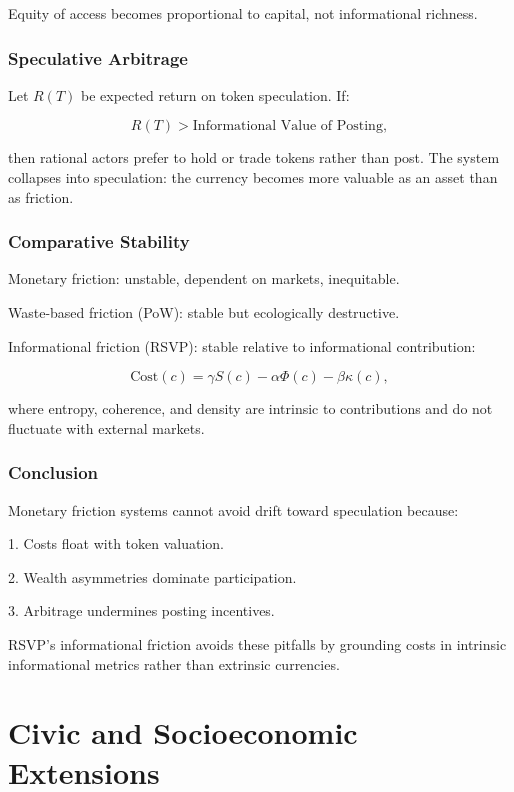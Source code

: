 \documentclass{book}
\begin{document}
Equity of access becomes proportional to capital, not informational richness.

\section{Speculative Arbitrage}

Let \( R(T) \) be expected return on token speculation. If:

\[ R(T) > \text{Informational Value of Posting}, \]

then rational actors prefer to hold or trade tokens rather than post. The system collapses into speculation: the currency becomes more valuable as an asset than as friction.

\section{Comparative Stability}

Monetary friction: unstable, dependent on markets, inequitable.

Waste-based friction (PoW): stable but ecologically destructive.

Informational friction (RSVP): stable relative to informational contribution:

\[ \text{Cost}(c) = \gamma S(c) - \alpha \Phi(c) - \beta \kappa(c), \]

where entropy, coherence, and density are intrinsic to contributions and do not fluctuate with external markets.

\section{Conclusion}

Monetary friction systems cannot avoid drift toward speculation because:

1. Costs float with token valuation.

2. Wealth asymmetries dominate participation.

3. Arbitrage undermines posting incentives.

RSVP’s informational friction avoids these pitfalls by grounding costs in intrinsic informational metrics rather than extrinsic currencies.

\part{Civic and Socioeconomic Extensions}
\end{document}
